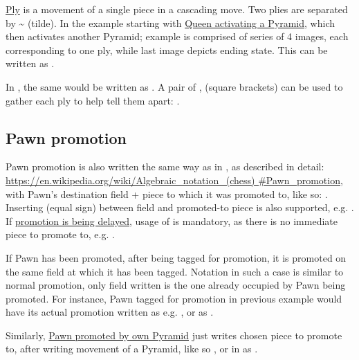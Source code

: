 \hyperref[sec:Terms/Ply]{Ply} is a movement of a single piece in a cascading move. Two plies
are separated by \~{} (tilde). In the example starting with
\hyperref[fig:scn_ma_15_cascading_init]{Queen activating a Pyramid}, which then activates
another Pyramid; example is comprised of series of 4 images, each corresponding to one ply,
while last image depicts ending state. This can be written as .

In , the same would be written as \newline
{}. A pair of \alg{[}, \alg{]} (square brackets) can be used
to gather each ply to help tell them apart: \newline
\alg{[Qk2-f7]\~{}[Af7-i7]\~{}[Ai7-i9]}.

\subsection*{Pawn promotion}
\label{sec:Appendix/Notation/Pawn promotion}

Pawn promotion is also written the same way as in , as described in detail: \newline
\href{https://en.wikipedia.org/wiki/Algebraic\_notation\_(chess)\#Pawn\_promotion}{https://en.wikipedia.org/wiki/Algebraic\_notation\_(chess)\newline
\#Pawn\_promotion}, with Pawn's destination field + piece to which it was promoted to,
like so: . Inserting \alg{=} (equal sign) between field and promoted-to piece
is also supported, e.g. .
If \hyperref[fig:scn_aoa_05_delayed_promo_pawn_2_moved]{promotion is being delayed}, usage
of \alg{=} is mandatory, as there is no immediate piece to promote to, e.g. .

If Pawn has been promoted, after being tagged for promotion, it is promoted on the same
field at which it has been tagged. Notation in such a case is similar to normal promotion,
only field written is the one already occupied by Pawn being promoted. For instance, Pawn
tagged for promotion in previous example would have its actual promotion written as e.g.
, or as .

Similarly, \hyperref[fig:scn_ma_05_promo_init]{Pawn promoted by own Pyramid} just writes
chosen piece to promote to, after writing movement of a Pyramid, like so ,
or in  as \alg{[El4-d8]\~{}[Ad8-h8=Q]}.

